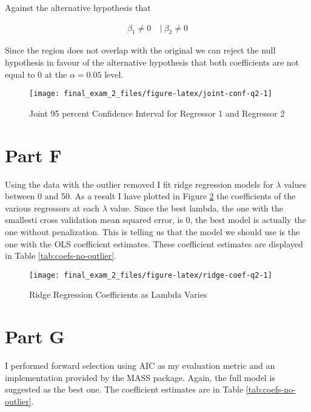 \documentclass[]{book}
\begin{document}
Against the alternative hypothesis that

\begin{align}
  \beta_1 \neq 0\ &|\ \beta_2 \neq 0
\end{align}

Since the region does not overlap with the original we can reject the null hypothesis in favour of the alternative hypothesis that both coefficients are not equal to 0 at the \(\alpha = 0.05\) level.

\begin{figure}

{\centering \texttt{[image: final\_exam\_2\_files/figure-latex/joint-conf-q2-1]} 

}

\caption{Joint 95 percent Confidence Interval for Regressor 1 and Regressor 2}\label{fig:joint-conf-q2}
\end{figure}

\hypertarget{part-f}{%
\section{Part F}\label{part-f}}

Using the data with the outlier removed I fit ridge regression models for \(\lambda\) values between 0 and 50. As a result I have plotted in Figure \ref{fig:ridge-coef-q2} the coefficients of the various regressors at each \(\lambda\) value. Since the best lambda, the one with the smallesti cross validation mean squared error, is 0, the best model is actually the one without penalization. This is telling us that the model we should use is the one with the OLS coefficient estimates. These coefficient estimates are displayed in Table \ref{tab:coefs-no-outlier}.

\begin{figure}

{\centering \texttt{[image: final\_exam\_2\_files/figure-latex/ridge-coef-q2-1]} 

}

\caption{Ridge Regression Coefficients as Lambda Varies}\label{fig:ridge-coef-q2}
\end{figure}

\hypertarget{part-g}{%
\section{Part G}\label{part-g}}

I performed forward selection using AIC as my evaluation metric and an implementation provided by the MASS package. Again, the full model is suggested as the best one. The coefficient estimates are in Table \ref{tab:coefs-no-outlier}.
\end{document}
